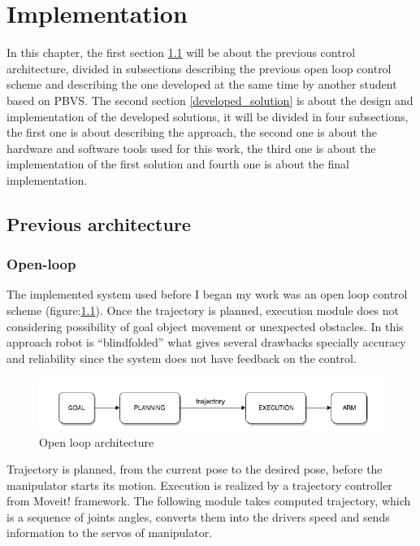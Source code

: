 \chapter{Implementation}
\label{chapter:Implementation}

In this chapter, the first section \ref{Previous_architecture} will be about the previous control architecture, divided in subsections describing the previous open loop control scheme and describing the one developed at the same time by another student based on \gls{PBVS}. The second section \ref{developed_solution} is about the  design and implementation of the developed solutions, it will be divided in four subsections, the first one is about describing the approach, the second one is about the hardware and software tools used for this work, the third one is about the implementation of the first solution and fourth one is about the final implementation.

\section{Previous architecture}
\label{Previous_architecture}
\subsection{Open-loop}
The implemented system used before I began my work was an open loop control scheme (figure:\ref{pict:open_loop}). Once the trajectory is planned, execution module does not considering possibility of goal object movement or unexpected obstacles. In this approach robot is “blindfolded” what gives several drawbacks specially accuracy and reliability since the system does not have feedback on the control.
\begin{figure} [!ht]
    \centering
    \includegraphics[width=0.75\linewidth]{images/open_loop.png}
    \caption{Open loop architecture}
    \label{pict:open_loop}
\end{figure}

Trajectory is planned, from the current pose to the desired pose, before the manipulator starts its motion. Execution is realized by a trajectory controller from Moveit! framework. The following module takes computed trajectory, which is a sequence of joints angles, converts them into the drivers speed and sends information to the servos of manipulator. 

